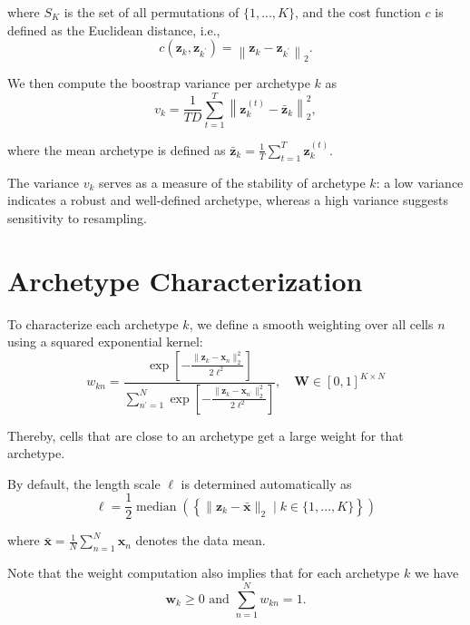 \documentclass{article}
\begin{document}
where $S_K$ is the set of all permutations of $\{1, ..., K\}$, and the cost function $c$ is defined as the Euclidean distance, i.e.,
\begin{equation}
    c(\mathbf{z}_k, \mathbf{z}_{k^\prime}) = \left\| \mathbf{z}_k - \mathbf{z}_{k^\prime} \right\|_2.
\end{equation}

We then compute the boostrap variance per archetype $k$ as
\begin{equation}
    v_k = \frac{1}{T D} \sum_{t=1}^T \left\| \mathbf{z}_k^{(t)} - \bar{\mathbf{z}}_k \right\|_2^2,
\end{equation}

where the mean archetype is defined as $\bar{\mathbf{z}}_k = \frac{1}{T} \sum_{t=1}^T \mathbf{z}_k^{(t)}$.

The variance $v_k$ serves as a measure of the stability of archetype $k$: a low variance indicates a robust and well-defined archetype, whereas a high variance suggests sensitivity to resampling.

\section{Archetype Characterization}
\label{sec:archetype_character}

To characterize each archetype $k$, we define a smooth weighting over all cells $n$ using a squared exponential kernel:
\begin{equation}
    w_{kn} = \frac{
        \exp \left[ - \frac{\| \mathbf{z}_k - \mathbf{x}_n \|_2^2 }{ 2 \ell^2} \right]
        }{
        \sum_{n^\prime=1}^N \exp \left[ - \frac{\| \mathbf{z}_k - \mathbf{x}_{n^\prime} \|_2^2 }{ 2 \ell^2} \right]
        }, \quad \mathbf{W} \in [0, 1]^{K \times N}
\end{equation}

Thereby, cells that are close to an archetype get a large weight for that archetype.

By default, the length scale $\ell$ is determined automatically as
\begin{equation}
    \ell = \frac{1}{2} \operatorname{median} \left( \left\{\| \mathbf{z}_k - \bar{\mathbf{x}} \|_2 \mid k \in \{1, ..., K\} \right\} \right)
\end{equation}

where $\bar{\mathbf{x}} = \frac{1}{N} \sum_{n=1}^N \mathbf{x}_n$ denotes the data mean.

Note that the weight computation also implies that for each archetype $k$ we have
\begin{equation}
    \mathbf{w}_{k} \geq 0 \text{ and } \sum_{n=1}^N w_{kn} = 1.
\end{equation}
\end{document}
